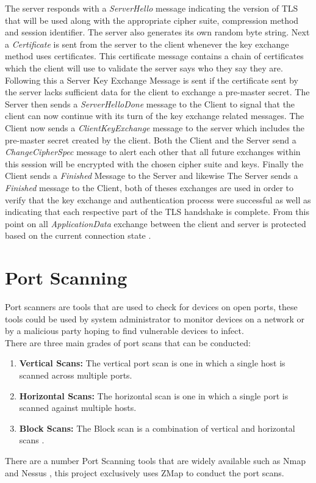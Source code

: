 \documentclass[a4wide,leqno,12pt]{report}
\begin{document}
The server responds with a \textit{ServerHello} message indicating the version of TLS that will be used along with the appropriate cipher suite, compression method and session identifier. The server also generates its own random byte string. Next a \textit{Certificate} is sent from the server to the client whenever the key exchange method uses certificates. This certificate message contains a chain of certificates which the client will use to validate the server says who they say they are. Following this a Server Key Exchange Message is sent if the certificate sent by the server lacks sufficient data for the client to exchange a pre-master secret. The Server then sends a \textit{ServerHelloDone} message to the Client to signal that the client can now continue with its turn of the key exchange related messages. The Client now sends a \textit{ClientKeyExchange} message to the server which includes the pre-master secret created by the client. Both the Client and the Server send a \textit{ChangeCipherSpec} message to alert each other that all future exchanges within this session will be encrypted with the chosen cipher suite and keys. Finally the Client sends a \textit{Finished} Message to the Server and likewise The Server sends a \textit{Finished } message to the Client, both of theses exchanges are used in order to verify that the key exchange and authentication process were successful as well as indicating that each respective part of the TLS handshake is complete. From this point on all \textit{ApplicationData} exchange between the client and server is protected based on the current connection state \cite{tlsDemoServer}\cite{turner2014transport}.
\section{Port Scanning}
Port scanners are tools that are used to check for devices on open ports, these tools could be used by system administrator to monitor devices on a network or by a malicious party hoping to find vulnerable devices to infect.\\
There are three main grades of port scans that can be conducted:
\begin{enumerate}
\item\textbf{Vertical Scans:}
The vertical port scan is one in which a single host is scanned across multiple ports.
\item\textbf{Horizontal Scans:}
The horizontal scan is one in which a single port is scanned against multiple hosts.
\item\textbf{Block Scans:}
The Block scan is a combination of vertical and horizontal scans \cite{lee2003detection}.
\end{enumerate}
There are a number Port Scanning tools that are widely available such as Nmap \cite{lyon2009nmap} and Nessus \cite{beale2004nessus}, this project exclusively uses ZMap \cite{durumeric2013zmap} to conduct the port scans.
\end{document}
